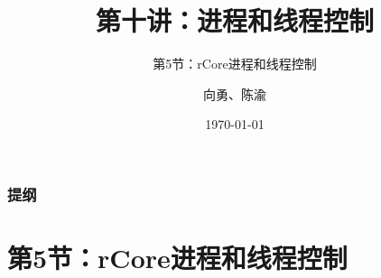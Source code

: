 



\title[第10讲]{第十讲：进程和线程控制} %
\subtitle{第5节：rCore进程和线程控制}
\author{向勇、陈渝} %
\date{\today} %



\begin{frame}
\titlepage %
\end{frame}
\begin{frame}
\frametitle{提纲} %
\tableofcontents %
\end{frame}
\section{第5节：rCore进程和线程控制}%
